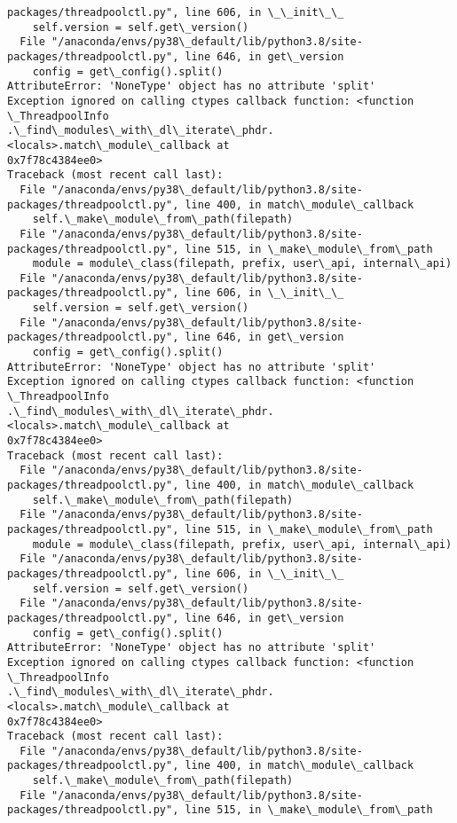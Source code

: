 \documentclass[11pt]{article}
\begin{document}
\begin{Verbatim}[commandchars=\\\{\}]
packages/threadpoolctl.py", line 606, in \_\_init\_\_
    self.version = self.get\_version()
  File "/anaconda/envs/py38\_default/lib/python3.8/site-
packages/threadpoolctl.py", line 646, in get\_version
    config = get\_config().split()
AttributeError: 'NoneType' object has no attribute 'split'
Exception ignored on calling ctypes callback function: <function \_ThreadpoolInfo
.\_find\_modules\_with\_dl\_iterate\_phdr.<locals>.match\_module\_callback at
0x7f78c4384ee0>
Traceback (most recent call last):
  File "/anaconda/envs/py38\_default/lib/python3.8/site-
packages/threadpoolctl.py", line 400, in match\_module\_callback
    self.\_make\_module\_from\_path(filepath)
  File "/anaconda/envs/py38\_default/lib/python3.8/site-
packages/threadpoolctl.py", line 515, in \_make\_module\_from\_path
    module = module\_class(filepath, prefix, user\_api, internal\_api)
  File "/anaconda/envs/py38\_default/lib/python3.8/site-
packages/threadpoolctl.py", line 606, in \_\_init\_\_
    self.version = self.get\_version()
  File "/anaconda/envs/py38\_default/lib/python3.8/site-
packages/threadpoolctl.py", line 646, in get\_version
    config = get\_config().split()
AttributeError: 'NoneType' object has no attribute 'split'
Exception ignored on calling ctypes callback function: <function \_ThreadpoolInfo
.\_find\_modules\_with\_dl\_iterate\_phdr.<locals>.match\_module\_callback at
0x7f78c4384ee0>
Traceback (most recent call last):
  File "/anaconda/envs/py38\_default/lib/python3.8/site-
packages/threadpoolctl.py", line 400, in match\_module\_callback
    self.\_make\_module\_from\_path(filepath)
  File "/anaconda/envs/py38\_default/lib/python3.8/site-
packages/threadpoolctl.py", line 515, in \_make\_module\_from\_path
    module = module\_class(filepath, prefix, user\_api, internal\_api)
  File "/anaconda/envs/py38\_default/lib/python3.8/site-
packages/threadpoolctl.py", line 606, in \_\_init\_\_
    self.version = self.get\_version()
  File "/anaconda/envs/py38\_default/lib/python3.8/site-
packages/threadpoolctl.py", line 646, in get\_version
    config = get\_config().split()
AttributeError: 'NoneType' object has no attribute 'split'
Exception ignored on calling ctypes callback function: <function \_ThreadpoolInfo
.\_find\_modules\_with\_dl\_iterate\_phdr.<locals>.match\_module\_callback at
0x7f78c4384ee0>
Traceback (most recent call last):
  File "/anaconda/envs/py38\_default/lib/python3.8/site-
packages/threadpoolctl.py", line 400, in match\_module\_callback
    self.\_make\_module\_from\_path(filepath)
  File "/anaconda/envs/py38\_default/lib/python3.8/site-
packages/threadpoolctl.py", line 515, in \_make\_module\_from\_path

\end{Verbatim}
\end{document}
